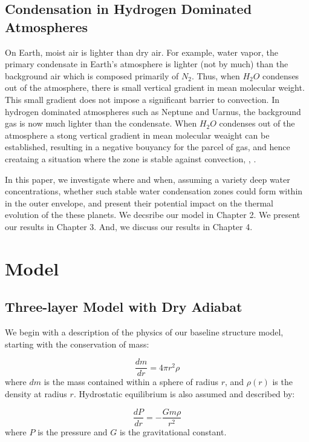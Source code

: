 \documentclass[11pt]{ucscthesisbs}
\begin{document}
\section{Condensation in Hydrogen Dominated Atmospheres}
On Earth, moist air is lighter than dry air. For example, water vapor, the primary condensate in Earth's atmosphere is lighter (not by much) than the background air which is composed primarily of $N_{2}$. Thus, when $H_{2}O$ condenses out of the atmosphere, there is small vertical gradient in mean molecular weight. This small gradient does not impose a significant barrier to convection. In hydrogen dominated atmospheres such as Neptune and Uarnus, the background gas is now much lighter than the condensate. When $H_{2}O$ condenses out of the atmosphere a stong vertical gradient in mean molecular weaight can be established, resulting in a negative bouyancy for the parcel of gas, and hence creataing a situation where the zone is stable against convection\citep{guillot_1995}, \citep{friedson_2017}, \citep{leconte_2017}.

In this paper, we investigate where and when, assuming a variety deep water concentrations, whether such stable water condensation zones could form within in the outer envelope, and present their potential impact on the thermal evolution of the these planets. We decsribe our model in Chapter 2. We present our results in Chapter 3. And, we discuss our results in Chapter 4.


\chapter{Model}

\section{Three-layer Model with Dry Adiabat}
We begin with a description of the physics of our baseline structure model, starting with the conservation of mass:

\begin{equation}
  \frac{dm}{dr} =4 \pi r^{2}\rho  
\end{equation}
where $dm$ is the mass contained within a sphere of radius $r$, and $\rho(r)$ is the density at radius $r$. Hydrostatic equilibrium is also assumed and described by:

\begin{equation}
  \frac{dP}{dr} = -\frac{Gm\rho}{r^{2}}  
\end{equation}
where $P$ is the pressure and $G$ is the gravitational constant. 
\end{document}
